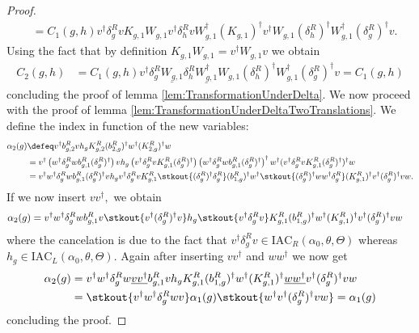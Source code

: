 \begin{proof}
\begin{align}
		\nonumber
		&=C_1(g,h)v^\dagger \delta_g^R v K_{g,1} W_{g,1}v^\dagger \delta_h^R v W_{g,1}^\dagger (K_{g,1})^\dagger v^\dagger W_{g,1}(\delta^R_h)^\dagger W_{g,1}^\dagger(\delta_g^R)^\dagger v.
	\end{align}
	Using the fact that by definition $K_{g,1}W_{g,1}=v^\dagger W_{g,1}v$ we obtain
	\begin{align}
		C_2(g,h)&=C_1(g,h)v^\dagger \delta_g^R \underline{W_{g,1}} \delta_h^R \underline{W_{g,1}^\dagger} W_{g,1}(\delta^R_h)^\dagger W_{g,1}^\dagger(\delta_g^R)^\dagger v=C_1(g,h)
	\end{align}
	concluding the proof of lemma \ref{lem:TransformationUnderDelta}. We now proceed with the proof of lemma \ref{lem:TransformationUnderDeltaTwoTranslations}. We define the index in function of the new variables:
	\begin{align}
		\nonumber
		\alpha_2(g)&\defeq v^\dagger b^R_{g,2}v h_g K^R_{g,2}(b^R_{2,g})^\dagger w^\dagger (K^R_{2,g})^\dagger w\\
		&=v^\dagger \left(w^\dagger\delta^R_g w b_{g,1}^R (\delta^R_g)^\dagger\right) v h_g \left(v^\dagger \delta_g^R v K_{g,1}^R (\delta_g^R)^\dagger\right) \left(w^\dagger\delta^R_g w b_{g,1}^R (\delta^R_g)^\dagger\right)^\dagger w^\dagger (v^\dagger \delta_g^R v K_{g,1}^R (\delta_g^R)^\dagger)^\dagger w\\
		\nonumber
		&=v^\dagger w^\dagger\delta^R_g w b_{g,1}^R (\delta^R_g)^\dagger v h_g v^\dagger \delta_g^R v K_{g,1}^R \stkout{(\delta_g^R)^\dagger \delta_g^R} (b_{1,g}^R)^\dagger w^\dagger \stkout{(\delta_g^R)^\dagger w w^\dagger \delta_g^R} (K_{g,1}^R)^\dagger v^\dagger (\delta_g^R)^\dagger v  w.
	\end{align}
	If we now insert $vv^\dagger,$ we obtain
	\begin{align}
		\alpha_2(g)&=v^\dagger w^\dagger\delta^R_g w b_{g,1}^R v\stkout{v^\dagger (\delta^R_g)^\dagger v} h_g \stkout{v^\dagger \delta_g^R v} K_{g,1}^R (b_{1,g}^R)^\dagger w^\dagger (K_{g,1}^R)^\dagger v^\dagger (\delta_g^R)^\dagger v  w
	\end{align}
	where the cancelation is due to the fact that $v^\dagger \delta^R_g v\in\textrm{IAC}_{R}(\alpha_0,\theta,\Theta)$ whereas $h_g\in \textrm{IAC}_{L}(\alpha_0,\theta,\Theta)$. Again after inserting $vv^\dagger$ and $ww^\dagger$ we now get
	\begin{align}
		\alpha_2(g)&=v^\dagger w^\dagger\delta^R_g w \underline{v v^\dagger} b_{g,1}^R v h_g K_{g,1}^R (b_{1,g}^R)^\dagger w^\dagger (K_{g,1}^R)^\dagger \underline{ww^\dagger} v^\dagger (\delta_g^R)^\dagger v  w\\
		\nonumber
		&=\stkout{v^\dagger w^\dagger\delta^R_g w v} \alpha_1(g) \stkout{w^\dagger v^\dagger (\delta_g^R)^\dagger v  w}=\alpha_1(g)
	\end{align}
	concluding the proof.
\end{proof}
